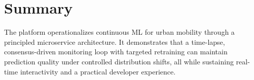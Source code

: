 \section{Summary}
The platform operationalizes continuous ML for urban mobility through a principled microservice architecture.
It demonstrates that a time-lapse, consensus-driven monitoring loop with targeted retraining can maintain prediction quality under controlled distribution shifts, all while sustaining real-time interactivity and a practical developer experience.
